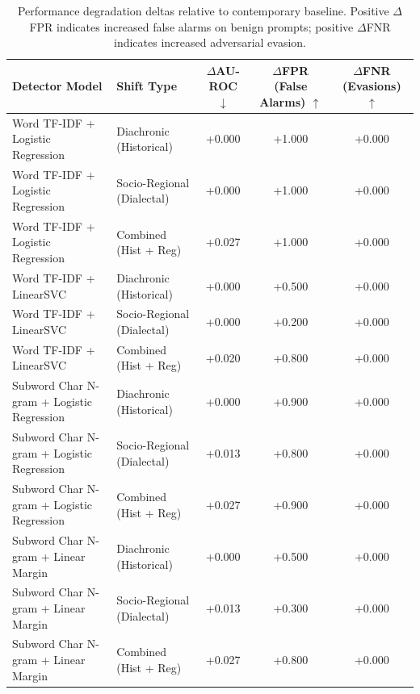 \begin{table}[t]
\centering
\small
\begin{tabular}{llccc}
\toprule
\textbf{Detector Model} & \textbf{Shift Type} & $\Delta$\textbf{AU-ROC} $\downarrow$ & $\Delta$\textbf{FPR (False Alarms)} $\uparrow$ & $\Delta$\textbf{FNR (Evasions)} $\uparrow$ \\
\midrule
Word TF-IDF + Logistic Regression & Diachronic (Historical) & +0.000 & +1.000 & +0.000 \\
Word TF-IDF + Logistic Regression & Socio-Regional (Dialectal) & +0.000 & +1.000 & +0.000 \\
Word TF-IDF + Logistic Regression & Combined (Hist + Reg) & +0.027 & +1.000 & +0.000 \\
\midrule
Word TF-IDF + LinearSVC & Diachronic (Historical) & +0.000 & +0.500 & +0.000 \\
Word TF-IDF + LinearSVC & Socio-Regional (Dialectal) & +0.000 & +0.200 & +0.000 \\
Word TF-IDF + LinearSVC & Combined (Hist + Reg) & +0.020 & +0.800 & +0.000 \\
\midrule
Subword Char N-gram + Logistic Regression & Diachronic (Historical) & +0.000 & +0.900 & +0.000 \\
Subword Char N-gram + Logistic Regression & Socio-Regional (Dialectal) & +0.013 & +0.800 & +0.000 \\
Subword Char N-gram + Logistic Regression & Combined (Hist + Reg) & +0.027 & +0.900 & +0.000 \\
\midrule
Subword Char N-gram + Linear Margin & Diachronic (Historical) & +0.000 & +0.500 & +0.000 \\
Subword Char N-gram + Linear Margin & Socio-Regional (Dialectal) & +0.013 & +0.300 & +0.000 \\
Subword Char N-gram + Linear Margin & Combined (Hist + Reg) & +0.027 & +0.800 & +0.000 \\
\bottomrule
\end{tabular}
\caption{Performance degradation deltas relative to contemporary baseline. Positive $\Delta$FPR indicates increased false alarms on benign prompts; positive $\Delta$FNR indicates increased adversarial evasion.}
\label{tab:degradation_deltas}
\end{table}